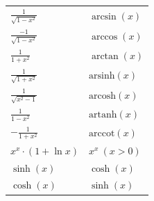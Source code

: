 \documentclass[a4paper,10pt]{article}
\begin{document}
\begin{center}
\begin{tabularx}{\linewidth}{>{\centering\arraybackslash}X>{\centering\arraybackslash}X}
		$\frac{1}{\sqrt{1 - x^2}}$          & $\arcsin(x)$                                                        \\
		$\frac{-1}{\sqrt{1 - x^2}}$         & $\arccos(x)$                                                        \\
		$\frac{1}{1 + x^2}$                 & $\arctan(x)$                                                        \\
		$\frac{1}{\sqrt{1 + x^2}}$          & $\text{arsinh}(x)$                                                  \\
		$\frac{1}{\sqrt{x^2 - 1}}$          & $\text{arcosh}(x)$                                                  \\
		$\frac{1}{1 - x^2}$                 & $\text{artanh}(x)$                                                  \\
		$-\frac{1}{1 + x^2}$                & $\text{arccot}(x)$                                                  \\
		$x^x \cdot (1 + \ln x)$             & $x^x \ (x > 0)$                                                     \\
		$\sinh(x)$                          & $\cosh(x)$                                                          \\
		$\cosh(x)$                          & $\sinh(x)$                                                          \\
		\bottomrule
	\end{tabularx}
\end{center}

\clearpage
\newpage
\end{document}
